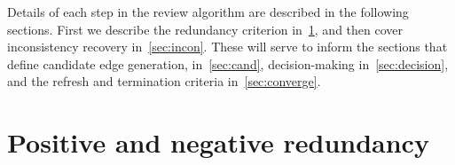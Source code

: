 Details of each step in the review algorithm are described in the following sections.
First we describe the redundancy criterion in~\cref{sec:redun}, and then cover inconsistency recovery
  in~\cref{sec:incon}.
These will serve to inform the sections that define candidate edge generation, in~\cref{sec:cand},
  decision-making in~\cref{sec:decision}, and the refresh and termination criteria in~\cref{sec:converge}.


\FloatBarrier{}
\section{Positive and negative redundancy}\label{sec:redun}

